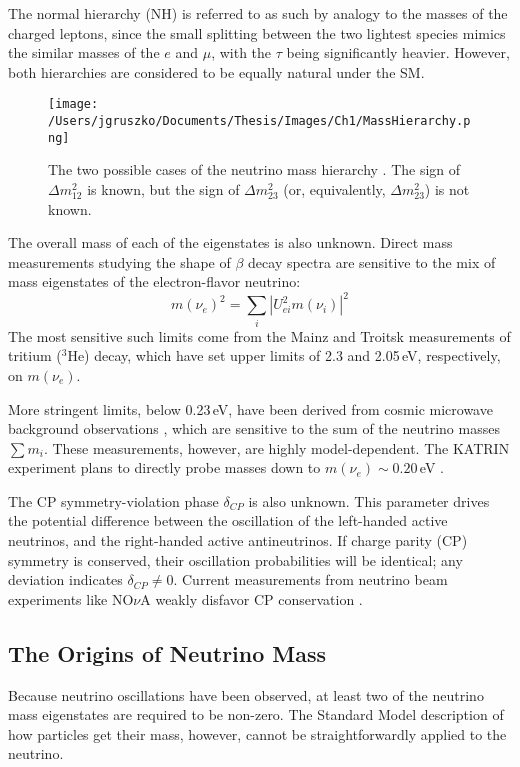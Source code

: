 The normal hierarchy (NH) is referred to as such by analogy to the masses of the charged leptons, since the small splitting between the two lightest species mimics the similar masses of the $e$ and $\mu$, with the $\tau$ being significantly heavier. However, both hierarchies are considered to be equally natural under the SM. 

\begin{figure}[]
\hfil \texttt{[image: /Users/jgruszko/Documents/Thesis/Images/Ch1/MassHierarchy.png]} \hfil
\caption[The two possibilities for the neutrino mass hierarchy]{The two possible cases of the neutrino mass hierarchy \cite{Hewett2012}. The sign of $\Delta m_{12}^2$ is known, but the sign of $\Delta m_{23}^2$ (or, equivalently, $\Delta m_{23}^2$) is not known.}
\label{mass_hierarchy}
\end{figure}

The overall mass of each of the eigenstates is also unknown. Direct mass measurements studying the shape of $\beta$ decay spectra are sensitive to the mix of mass eigenstates of the electron-flavor neutrino: 
$$m(\nu_e)^2 = \sum_i \left|U^2_{ei}m(\nu_i)\right|^2 $$
The most sensitive such limits come from the Mainz \cite{Mainz2005} and Troitsk \cite{Troitsk2011} measurements of tritium ($^3$He) decay, which have set upper limits of 2.3 and 2.05\,eV, respectively, on $m(\nu_e)$. 

More stringent limits, below 0.23\,eV, have been derived from cosmic microwave background observations \cite{PlanckXVI_2013}, which are sensitive to the sum of the neutrino masses $\sum m_i$. These measurements, however, are highly model-dependent. The KATRIN experiment plans to directly probe masses down to $m(\nu_e) \sim 0.20$\,eV \cite{KATRIN2015}. 

The CP symmetry-violation phase $\delta_{CP}$ is also unknown. This parameter drives the potential difference between the oscillation of the left-handed active neutrinos, and the right-handed active antineutrinos. If charge parity (CP) symmetry is conserved, their oscillation probabilities will be identical; any deviation indicates $\delta_{CP} \neq 0$. Current measurements from neutrino beam experiments like NO$\nu$A weakly disfavor CP conservation \cite{NOvA2016}. 

\subsection{The Origins of Neutrino Mass}
Because neutrino oscillations have been observed, at least two of the neutrino mass eigenstates are required to be non-zero. The Standard Model description of how particles get their mass, however, cannot be straightforwardly applied to the neutrino. 

